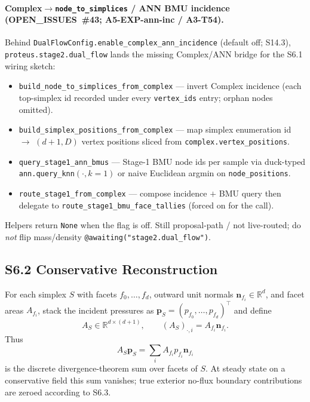 \documentclass[11pt]{article}
\begin{document}
\paragraph{Complex$\to$\texttt{node\_to\_simplices} / ANN BMU incidence
(OPEN\_ISSUES~\#43; A5-EXP-ann-inc / A3-T54).}
Behind \texttt{DualFlowConfig.enable\_complex\_ann\_incidence} (default off;
S14.3), \texttt{proteus.stage2.dual\_flow} lands the missing Complex/ANN
bridge for the S6.1 wiring sketch:
\begin{itemize}[leftmargin=1.5em]
  \item \texttt{build\_node\_to\_simplices\_from\_complex} --- invert Complex
  incidence (each top-simplex id recorded under every
  \texttt{vertex\_ids} entry; orphan nodes omitted).
  \item \texttt{build\_simplex\_positions\_from\_complex} --- map simplex
  enumeration id $\to$ $(d{+}1,D)$ vertex positions sliced from
  \texttt{complex.vertex\_positions}.
  \item \texttt{query\_stage1\_ann\_bmus} --- Stage-1 BMU node ids per sample
  via duck-typed \texttt{ann.query\_knn}$(\cdot,k{=}1)$ or naive Euclidean
  argmin on \texttt{node\_positions}.
  \item \texttt{route\_stage1\_from\_complex} --- compose incidence $+$ BMU
  query then delegate to \texttt{route\_stage1\_bmu\_face\_tallies} (forced
  on for the call).
\end{itemize}
Helpers return \texttt{None} when the flag is off. Still proposal-path / not
live-routed; do \emph{not} flip mass/density
\texttt{@awaiting("stage2.dual\_flow")}.

\subsection*{S6.2 Conservative Reconstruction}
For each simplex $S$ with facets $f_0,\dots,f_d$, outward unit normals $\mathbf n_{f_i}\in\mathbb R^d$, and facet areas $A_{f_i}$, stack the incident pressures as $\mathbf p_S=(p_{f_0},\dots,p_{f_d})^\top$ and define
\[
A_S\in\mathbb R^{d\times(d+1)},
\qquad
(A_S)_{\cdot,i}=A_{f_i}\mathbf n_{f_i}.
\]
Thus
\[
A_S\mathbf p_S
=
\sum_i A_{f_i}p_{f_i}\mathbf n_{f_i}
\]
is the discrete divergence-theorem sum over facets of $S$. At steady state on a conservative field this sum vanishes; true exterior no-flux boundary contributions are zeroed according to S6.3.
\end{document}
